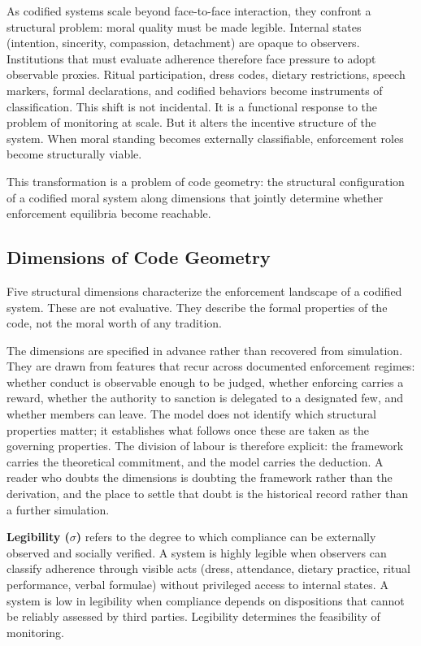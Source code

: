 \documentclass[12pt]{article}
\begin{document}
As codified systems scale beyond face-to-face interaction, they confront a structural problem: moral quality must be made legible. Internal states (intention, sincerity, compassion, detachment) are opaque to observers. Institutions that must evaluate adherence therefore face pressure to adopt observable proxies. Ritual participation, dress codes, dietary restrictions, speech markers, formal declarations, and codified behaviors become instruments of classification. This shift is not incidental. It is a functional response to the problem of monitoring at scale. But it alters the incentive structure of the system. When moral standing becomes externally classifiable, enforcement roles become structurally viable.

This transformation is a problem of code geometry: the structural configuration of a codified moral system along dimensions that jointly determine whether enforcement equilibria become reachable.

\subsection{Dimensions of Code Geometry}

Five structural dimensions characterize the enforcement landscape of a codified system. These are not evaluative. They describe the formal properties of the code, not the moral worth of any tradition.

The dimensions are specified in advance rather than recovered from simulation. They are drawn from features that recur across documented enforcement regimes: whether conduct is observable enough to be judged, whether enforcing carries a reward, whether the authority to sanction is delegated to a designated few, and whether members can leave. The model does not identify which structural properties matter; it establishes what follows once these are taken as the governing properties. The division of labour is therefore explicit: the framework carries the theoretical commitment, and the model carries the deduction. A reader who doubts the dimensions is doubting the framework rather than the derivation, and the place to settle that doubt is the historical record rather than a further simulation.

\textbf{Legibility ($\sigma$)} refers to the degree to which compliance can be externally observed and socially verified. A system is highly legible when observers can classify adherence through visible acts (dress, attendance, dietary practice, ritual performance, verbal formulae) without privileged access to internal states. A system is low in legibility when compliance depends on dispositions that cannot be reliably assessed by third parties. Legibility determines the feasibility of monitoring.
\end{document}
